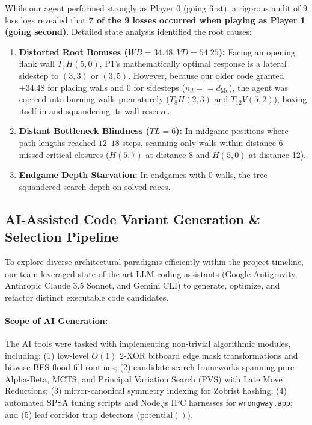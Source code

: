 While our agent performed strongly as Player 0 (going first), a rigorous audit of 9 loss logs revealed that \textbf{7 of the 9 losses occurred when playing as Player 1 (going second)}. Detailed state analysis identified the root causes:
\begin{enumerate}[leftmargin=1.5em]
    \item \textbf{Distorted Root Bonuses ($WB = 34.48, VD = 54.25$):} Facing an opening flank wall $T_7 H(5,0)$, P1's mathematically optimal response is a lateral sidestep to $(3,3)$ or $(3,5)$. However, because our older code granted $+34.48$ for placing walls and $0$ for sidesteps ($n_d == d_{\text{Me}}$), the agent was coerced into burning walls prematurely ($T_8 H(2,3)$ and $T_{12} V(5,2)$), boxing itself in and squandering its wall reserve.
    \item \textbf{Distant Bottleneck Blindness ($TL = 6$):} In midgame positions where path lengths reached $12\text{--}18$ steps, scanning only walls within distance 6 missed critical closures ($H(5,7)$ at distance 8 and $H(5,0)$ at distance 12).
    \item \textbf{Endgame Depth Starvation:} In endgames with 0 walls, the tree squandered search depth on solved races.
\end{enumerate}

\subsection{AI-Assisted Code Variant Generation \& Selection Pipeline}
To explore diverse architectural paradigms efficiently within the project timeline, our team leveraged state-of-the-art LLM coding assistants (Google Antigravity, Anthropic Claude 3.5 Sonnet, and Gemini CLI) to generate, optimize, and refactor distinct executable code candidates. 

\paragraph{Scope of AI Generation:} The AI tools were tasked with implementing non-trivial algorithmic modules, including: (1) low-level $O(1)$ 2-XOR bitboard edge mask transformations and bitwise BFS flood-fill routines; (2) candidate search frameworks spanning pure Alpha-Beta, MCTS, and Principal Variation Search (PVS) with Late Move Reductions; (3) mirror-canonical symmetry indexing for Zobrist hashing; (4) automated SPSA tuning scripts and Node.js IPC harnesses for \texttt{wrongway.app}; and (5) leaf corridor trap detectors ($\text{potential}()$).

